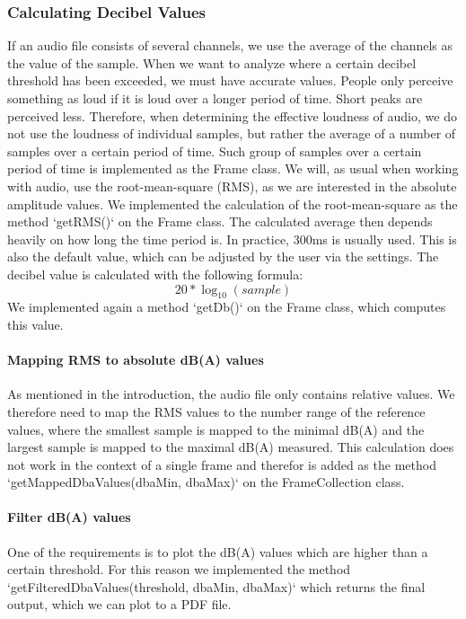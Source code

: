 \subsubsection{Calculating Decibel Values}
If an audio file consists of several channels, we use the average of the channels as the value of the sample.
When we want to analyze where a certain decibel threshold has been exceeded, we must have accurate values.
People only perceive something as loud if it is loud over a longer period of time.
Short peaks are perceived less.
Therefore, when determining the effective loudness of audio, we do not use the loudness of individual samples,
but rather the average of a number of samples over a certain period of time.
Such group of samples over a certain period of time is implemented as the Frame class.
We will, as usual when working with audio, use the root-mean-square (RMS),
as we are interested in the absolute amplitude values.
We implemented the calculation of the root-mean-square as the method `getRMS()` on the Frame class.
The calculated average then depends heavily on how long the time period is.
In practice, 300ms is usually used\cite{timespan_for_audio_rms_calculate}.
This is also the default value, which can be adjusted by the user via the settings.
The decibel value is calculated with the following formula\cite{decibel_wikipedia}:
\[20 * \log_{10} (sample)\]
We implemented again a method `getDb()` on the Frame class, which computes this value.

\paragraph{Mapping RMS to absolute dB(A) values}
As mentioned in the introduction, the audio file only contains relative values.
We therefore need to map the RMS values to the number range of the reference values,
where the smallest sample is mapped to the minimal dB(A) and the largest sample is mapped to the maximal dB(A) measured.
This calculation does not work in the context of a single frame and therefor is added as the method `getMappedDbaValues(dbaMin, dbaMax)` on the FrameCollection class.

\paragraph{Filter dB(A) values}
One of the requirements is to plot the dB(A) values which are higher than a certain threshold.
For this reason we implemented the method `getFilteredDbaValues(threshold, dbaMin, dbaMax)` which returns the final output,
which we can plot to a PDF file.

